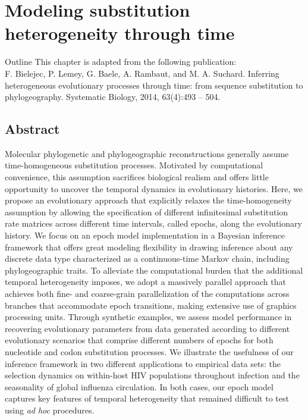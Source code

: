 \chapter{Modeling substitution heterogeneity through time\label{chap:epoch}}

\begin{remark}{Outline}
This chapter is adapted from the following publication: \\
F. Bielejec, P. Lemey, G. Baele, A. Rambaut, and M. A. Suchard. 
Inferring heterogeneous evolutionary processes through time: from sequence substitution to phylogeography. 
Systematic Biology, 2014, 63(4):493 -- 504.
\end{remark}

\section{Abstract}

Molecular phylogenetic and phylogeographic reconstructions generally assume time-homogeneous substitution processes.
Motivated by computational convenience, this assumption sacrifices biological realism and offers little opportunity to uncover the temporal dynamics in evolutionary histories.
%
Here, we propose an evolutionary approach that explicitly relaxes the time-homogeneity assumption by allowing the specification of different infinitesimal substitution rate matrices across different time intervals, called epochs, along the evolutionary history.
%
We focus on an epoch model implementation in a Bayesian inference framework that offers great modeling flexibility in drawing inference about any discrete data type characterized as a continuous-time Markov chain, including phylogeographic traits.
To alleviate the computational burden that the additional temporal heterogeneity imposes, we adopt a massively parallel approach that achieves both fine- and coarse-grain parallelization of the computations across branches that accommodate epoch transitions, making extensive use of graphics processing units.
Through synthetic examples, we assess model performance in recovering evolutionary parameters from data generated according to different evolutionary scenarios that comprise different numbers of epochs for both nucleotide and codon substitution processes. 
We illustrate the usefulness of our inference framework in two different applications to empirical data sets: the selection dynamics on within-host HIV populations throughout infection and the seasonality of global influenza circulation.
In both cases, our epoch model captures key features of temporal heterogeneity that remained difficult to test using \textit{ad hoc} procedures.

